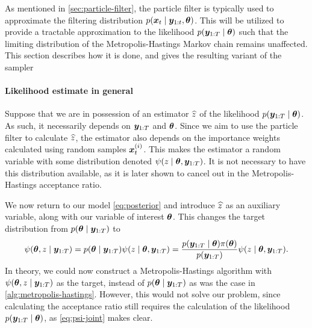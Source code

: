 As mentioned in \autoref{sec:particle-filter}, the particle filter is typically used to approximate the filtering distribution $p(\bm{x}_t \mid \bm{y}_{1:t}, \bm{\theta})$. This will be utilized to provide a tractable approximation to the likelihood $p(\bm{y}_{1:T} \mid \bm{\theta})$ such that the limiting distribution of the Metropolis-Hastings Markov chain remains unaffected. This section describes how it is done, and gives the resulting variant of the sampler

\paragraph{Likelihood estimate in general}
Suppose that we are in possession of an estimator $\widehat{z}$ of the likelihood $p(\bm{y}_{1:T} \mid \bm{\theta})$. As such, it necessarily depends on $\bm{y}_{1:T}$ and $\bm{\theta}$. Since we aim to use the particle filter to calculate $\widehat{z}$, the estimator also depends on the importance weights calculated using random samples $\bm{x}_t^{(i)}$. This makes the estimator a random variable with some distribution denoted $\psi(z \mid \bm{\theta}, \bm{y}_{1:T})$. It is not necessary to have this distribution available, as it is later shown to cancel out in the Metropolis-Hastings acceptance ratio.

We now return to our model \eqref{eq:posterior} and introduce $\widehat{z}$ as an auxiliary variable, along with our variable of interest $\bm{\theta}$. This changes the target distribution from $p(\bm{\theta} \mid \bm{y}_{1:T})$ to
\begin{equation} \label{eq:psi-joint}
\psi(\bm{\theta}, z \mid \bm{y}_{1:T}) = p(\bm{\theta} \mid \bm{y}_{1:T}) \psi(z \mid \bm{\theta}, \bm{y}_{1:T}) = \frac{p(\bm{y}_{1:T} \mid \bm{\theta}) \pi(\bm{\theta})}{p(\bm{y}_{1:T})} \psi(z \mid \bm{\theta}, \bm{y}_{1:T}).
\end{equation}
In theory, we could now construct a Metropolis-Hastings algorithm with $\psi(\bm{\theta}, z \mid \bm{y}_{1:T})$ as the target, instead of $p(\bm{\theta} \mid \bm{y}_{1:T})$ as was the case in \autoref{alg:metropolis-hastings}. However, this would not solve our problem, since calculating the acceptance ratio still requires the calculation of the likelihood $p(\bm{y}_{1:T} \mid \bm{\theta})$, as \eqref{eq:psi-joint} makes clear.

